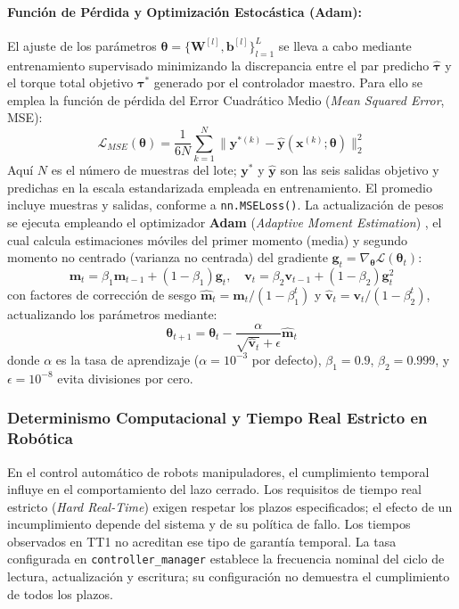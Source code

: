 \documentclass[12pt]{article}
\begin{document}
\paragraph{Función de Pérdida y Optimización Estocástica (Adam):}
El ajuste de los parámetros $\bm{\theta} = \{\bm{W}^{[l]}, \bm{b}^{[l]}\}_{l=1}^L$ se lleva a cabo mediante entrenamiento supervisado minimizando la discrepancia entre el par predicho $\hat{\bm{\tau}}$ y el torque total objetivo $\bm{\tau}^*$ generado por el controlador maestro. Para ello se emplea la función de pérdida del Error Cuadrático Medio (\textit{Mean Squared Error}, MSE):
\begin{equation}
\mathcal{L}_{MSE}(\bm{\theta}) = \frac{1}{6N} \sum_{k=1}^N \|\bm{y}^{*(k)} - \hat{\bm{y}}(\bm{x}^{(k)}; \bm{\theta})\|_2^2
\label{eq:loss_mse}
\end{equation}
Aquí $N$ es el número de muestras del lote; $\bm{y}^*$ y $\hat{\bm{y}}$ son las seis salidas objetivo y predichas en la escala estandarizada empleada en entrenamiento. El promedio incluye muestras y salidas, conforme a \texttt{nn.MSELoss()}.
La actualización de pesos se ejecuta empleando el optimizador \textbf{Adam} (\textit{Adaptive Moment Estimation}) \cite{kingma2014adam}, el cual calcula estimaciones móviles del primer momento (media) y segundo momento no centrado (varianza no centrada) del gradiente $\bm{g}_t = \nabla_{\bm{\theta}} \mathcal{L}(\bm{\theta}_t)$:
\begin{equation}
\bm{m}_t = \beta_1 \bm{m}_{t-1} + (1 - \beta_1) \bm{g}_t, \quad \bm{v}_t = \beta_2 \bm{v}_{t-1} + (1 - \beta_2) \bm{g}_t^2
\label{eq:adam_moments}
\end{equation}
con factores de corrección de sesgo $\hat{\bm{m}}_t = \bm{m}_t / (1 - \beta_1^t)$ y $\hat{\bm{v}}_t = \bm{v}_t / (1 - \beta_2^t)$, actualizando los parámetros mediante:
\begin{equation}
\bm{\theta}_{t+1} = \bm{\theta}_t - \frac{\alpha}{\sqrt{\hat{\bm{v}}_t} + \epsilon} \hat{\bm{m}}_t
\label{eq:adam_update}
\end{equation}
donde $\alpha$ es la tasa de aprendizaje ($\alpha = 10^{-3}$ por defecto), $\beta_1 = 0.9$, $\beta_2 = 0.999$, y $\epsilon = 10^{-8}$ evita divisiones por cero.

\subsubsection{Determinismo Computacional y Tiempo Real Estricto en Robótica}
\label{ssec:tiempo_real_estricto}
En el control automático de robots manipuladores, el cumplimiento temporal influye en el comportamiento del lazo cerrado. Los requisitos de tiempo real estricto (\textit{Hard Real-Time}) exigen respetar los plazos especificados; el efecto de un incumplimiento depende del sistema y de su política de fallo. Los tiempos observados en TT1 no acreditan ese tipo de garantía temporal. La tasa configurada en \texttt{controller\_manager} establece la frecuencia nominal del ciclo de lectura, actualización y escritura; su configuración no demuestra el cumplimiento de todos los plazos.
\end{document}
